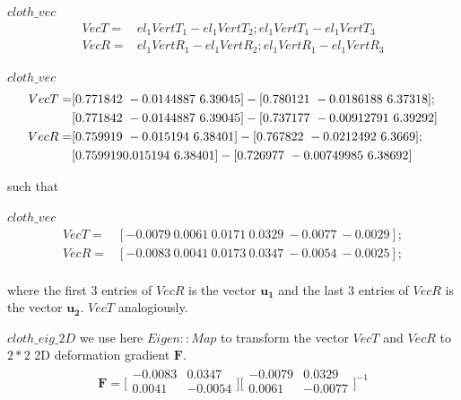 \documentclass{beamer}
\begin{document}
\begin{frame}
\begin{block}{$cloth\_vec$}
\begin{align}
VecT=&el_1VertT_1-el_1VertT_2;el_1VertT_1-el_1VertT_3 \\ 
VecR=&el_1VertR_1-el_1VertR_2;el_1VertR_1-el_1VertR_3 
\end{align}
\end{block}
\begin{block}{$cloth\_vec$}
\begin{align}
VecT=&[ 0.771842 \ -0.0144887 \ 6.39045 ]-[ 0.780121 \ -0.0186188 \ 6.37318 ];\\
     &[ 0.771842 \ -0.0144887 \ 6.39045 ]-[ 0.737177\ -0.00912791 \ 6.39292 ] \\
VecR=&[ 0.759919 \ -0.015194 \ 6.38401 ]-[ 0.767822 \ -0.0212492 \ 6.3669  ];\\
	 &[ 0.759919 \-0.015194  \ 6.38401 ]-[ 0.726977 \ -0.00749985 \ 6.38692 ] \\
\end{align}
\end{block}
\end{frame}


\begin{frame}
such that
\begin{block}{$cloth\_vec$}
\begin{align}
VecT=&[ -0.0079  \  0.0061 \  0.0171 \ 0.0329 \ -0.0077 \ -0.0029  ];\\ 
VecR=&[ -0.0083  \  0.0041 \  0.0173 \ 0.0347 \ -0.0054 \ -0.0025  ];\\
\end{align}
\end{block} 
where the first 3 entries of $VecR$ is the vector $\mathbf{u_1}$ and the last 3 entries of $VecR$ is the vector $\mathbf{u_2}$. $VecT$ analogiously.
\end{frame}


\begin{frame}
\begin{block}{$cloth\_eig\_2D$}
we use here $Eigen::Map$ to transform the vector $VecT$ and $VecR$ to $2*2$ 2D deformation gradient $\mathbf{F}$.
\begin{align}
\mathbf{F}
=
\biggl[
\begin{matrix}
   -0.0083 & 0.0347 \\
   0.0041 & -0.0054 \\
\end{matrix}
\biggr]
\biggl[
\begin{matrix}
   -0.0079 & 0.0329 \\
   0.0061 & -0.0077 \\
\end{matrix}
\biggr]^{-1}
\end{align} 
\end{block} 
\end{frame}
\end{document}
